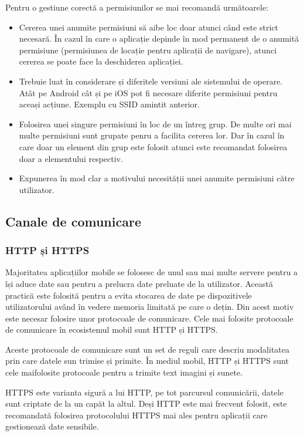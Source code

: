 \documentclass[12pt]{article}
\begin{document}
Pentru o gestiune corectă a permisiunilor se mai recomandă următoarele:

\begin{itemize}
    \item Cererea unei anumite permisiuni să aibe loc doar atunci când este strict necesară.
    În cazul în care o aplicație depinde în mod permanent de o anumită permisiune (permisiunea de locație pentru aplicații de navigare),
    atunci cererea se poate face la deschiderea aplicației.
    \item Trebuie luat în considerare și diferitele versiuni ale sistemului de operare. Atât pe Android cât și pe iOS
    pot fi necesare diferite permisiuni pentru aceași acțiune. Exemplu cu SSID amintit anterior.
    \item Folosirea unei singure permisiuni în loc de un întreg grup. De multe ori mai multe permisiuni sunt
    grupate penru a facilita cererea lor. Dar în cazul în care doar un element din grup este folosit atunci este 
    recomandat folosirea doar a elementului respectiv.
    \item Expunerea în mod clar a motivului necesității unei anumite permisiuni către utilizator.
\end{itemize}


\newpage
\subsection{Canale de comunicare}
\subsubsection{HTTP și HTTPS}

Majoritatea aplicațiilor mobile se folosesc de unul sau mai multe servere pentru a își aduce date
sau pentru a prelucra date preluate de la utilizator. Această practică este folosită pentru a evita  stocarea de
date pe dispozitivele utilizatorului având în vedere memoria limitată pe care o dețin. Din acest motiv 
este necesar folosire unor protocoale de comunicare. Cele mai folosite protocoale de comunicare în ecosistemul
mobil sunt HTTP și HTTPS.

Aceste protocoale de comunicare sunt un set de reguli care descriu modalitatea prin care datele sun trimise și 
primite. În mediul mobil, HTTP și HTTPS sunt cele maifolosite protocoale pentru a trimite text imagini și sunete.

HTTPS este varianta sigură a lui HTTP, pe tot parcursul comunicării, datele sunt criptate de la un capăt la altul.
Deși HTTP este mai frecvent folosit, este recomandată folosirea protocolului HTTPS mai ales pentru aplicații 
care gestionează date sensibile.
\end{document}
